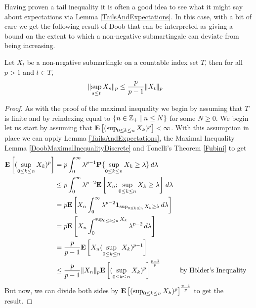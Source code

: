 Having proven a tail inequality it is often a good idea to see what it
might say about expectations via Lemma \ref{TailsAndExpectations}.  In
this case, with a bit of care we get the following result of Doob that
can be interpreted as giving a bound on the extent to which a
non-negative submartingale can deviate from being increasing.
\begin{lem}\label{DoobLpInequalityDiscrete}Let $X_t$ be a
  non-negative submartingle on a countable index set $T$, then for all
  $p > 1$ and $t \in T$,
\begin{align*}
\lVert \sup_{s \leq t} X_s \rVert_p &\leq \frac{p}{p-1}\lVert X_t \rVert_p
\end{align*}
\end{lem}
\begin{proof}
As with the proof of the maximal inequality we begin by assuming that
$T$ is finite and by reindexing equal to $\lbrace n \in \mathbb{Z}_+
\mid n \leq N\rbrace$ for some $N \geq 0$.
We begin let us start by assuming that $\textbf{E}\left[(\sup_{0 \leq k
    \leq n} X_k)^p\right] < \infty$.  With this assumption in place we can
apply Lemma \ref{TailsAndExpectations}, the Maximal Inequality Lemma
\ref{DoobMaximalInequalityDiscrete} and Tonelli's Theorem \ref{Fubini}
to get
\begin{align*}
\textbf{E}\left[(\sup_{0 \leq k \leq n} X_k)^p\right] &= p \int_0^\infty
\lambda^{p-1} \textbf{P}\{\sup_{0 \leq k \leq n} X_k \geq \lambda\} \,
d\lambda \\
&\leq p \int_0^\infty
\lambda^{p-2} \textbf{E}\left[X_n ; \sup_{0 \leq k \leq n} X_k \geq \lambda\right] \,
d\lambda \\
&=p \textbf{E}\left[X_n \int_0^\infty
\lambda^{p-2} \textbf{1}_{\sup_{0 \leq k \leq n} X_k \geq \lambda} \,
d\lambda\right] \\
&=p \textbf{E}\left[X_n \int_0^{\sup_{0 \leq k \leq n} X_k}
\lambda^{p-2} \, d\lambda\right] \\
&=\frac{p}{p-1} \textbf{E}\left[X_n (\sup_{0 \leq k \leq n} X_k)^{p-1} \right] \\
&\leq \frac{p}{p-1} \lVert X_n \rVert_p \textbf{E}\left[(\sup_{0 \leq k \leq n}
  X_k)^{p}\right]^{\frac{p-1}{p}} & & \text{by H\"{o}lder's Inequality}
\end{align*}
But now, we can divide both sides by $\textbf{E}\left[(\sup_{0 \leq k \leq n}
  X_k)^{p}\right]^{\frac{p-1}{p}}$ to get the result.


\end{proof}
